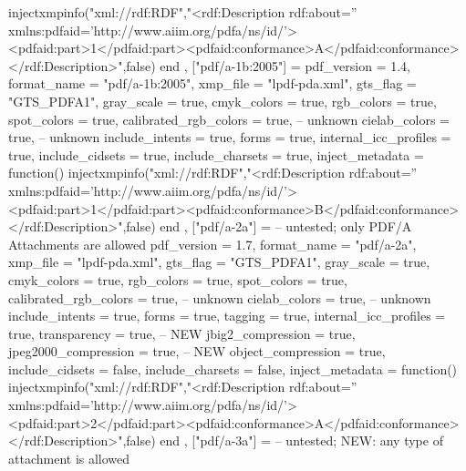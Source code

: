 {{                injectxmpinfo("xml://rdf:RDF","<rdf:Description rdf:about='' xmlns:pdfaid='http://www.aiim.org/pdfa/ns/id/'><pdfaid:part>1</pdfaid:part><pdfaid:conformance>A</pdfaid:conformance></rdf:Description>",false)
            end
        },
        ["pdf/a-1b:2005"] = {
            pdf_version             = 1.4,
            format_name             = "pdf/a-1b:2005",
            xmp_file                = "lpdf-pda.xml",
            gts_flag                = "GTS_PDFA1",
            gray_scale              = true,
            cmyk_colors             = true,
            rgb_colors              = true,
            spot_colors             = true,
            calibrated_rgb_colors   = true, -- unknown
            cielab_colors           = true, -- unknown
            include_intents         = true,
            forms                   = true,
            internal_icc_profiles   = true,
            include_cidsets         = true,
            include_charsets        = true,
            inject_metadata         = function()
                injectxmpinfo("xml://rdf:RDF","<rdf:Description rdf:about='' xmlns:pdfaid='http://www.aiim.org/pdfa/ns/id/'><pdfaid:part>1</pdfaid:part><pdfaid:conformance>B</pdfaid:conformance></rdf:Description>",false)
            end
        },
        ["pdf/a-2a"] = { -- untested; only PDF/A Attachments are allowed
            pdf_version             = 1.7,
            format_name             = "pdf/a-2a",
            xmp_file                = "lpdf-pda.xml",
            gts_flag                = "GTS_PDFA1",
            gray_scale              = true,
            cmyk_colors             = true,
            rgb_colors              = true,
            spot_colors             = true,
            calibrated_rgb_colors   = true, -- unknown
            cielab_colors           = true, -- unknown
            include_intents         = true,
            forms                   = true,
            tagging                 = true,
            internal_icc_profiles   = true,
            transparency            = true, -- NEW
            jbig2_compression       = true,
            jpeg2000_compression    = true, -- NEW
            object_compression      = true,
            include_cidsets         = false,
            include_charsets        = false,
            inject_metadata         = function()
                injectxmpinfo("xml://rdf:RDF","<rdf:Description rdf:about='' xmlns:pdfaid='http://www.aiim.org/pdfa/ns/id/'><pdfaid:part>2</pdfaid:part><pdfaid:conformance>A</pdfaid:conformance></rdf:Description>",false)
            end
        },
        ["pdf/a-3a"] = { -- untested; NEW: any type of attachment is allowed
}}
